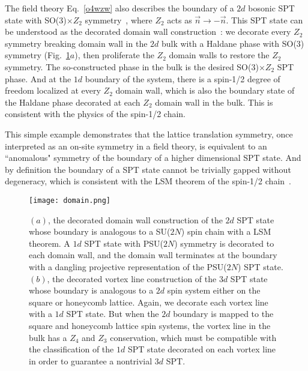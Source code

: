 \documentclass[aps,prb,twocolumn,superscriptaddress,showpacs]{revtex4}
\begin{document}

The field theory Eq.~\ref{o4wzw} also describes the boundary of a
$2d$ bosonic SPT state with SO(3)$\times Z_2$
symmetry~\cite{xu2dspt,xusenthil}, where $Z_2$ acts as $\vec{n}
\rightarrow - \vec{n}$. This SPT state can be understood as the
decorated domain wall construction~\cite{chenluashvin}: we
decorate every $Z_2$ symmetry breaking domain wall in the $2d$
bulk with a Haldane phase with SO(3) symmetry
(Fig.~\ref{domain}$a$), then proliferate the $Z_2$ domain walls to
restore the $Z_2$ symmetry. The so-constructed phase in the bulk
is the desired SO(3)$\times Z_2$ SPT phase. And at the $1d$
boundary of the system, there is a spin-1/2 degree of freedom
localized at every $Z_2$ domain wall, which is also the boundary
state of the Haldane phase decorated at each $Z_2$ domain wall in
the bulk. This is consistent with the physics of the spin-1/2
chain.

This simple example demonstrates that the lattice translation
symmetry, once interpreted as an on-site symmetry in a field
theory, is equivalent to an ``anomalous" symmetry of the boundary
of a higher dimensional SPT state. And by definition the boundary
of a SPT state cannot be trivially gapped without degeneracy,
which is consistent with the LSM theorem of the spin-1/2
chain~\cite{LSM}.

\begin{figure}[tbp]
\begin{center}
\texttt{[image: domain.png]}
\caption{$(a)$, the decorated domain wall construction of the $2d$
SPT state whose boundary is analogous to a SU($2N$) spin chain
with a LSM theorem. A $1d$ SPT state with PSU($2N$) symmetry is
decorated to each domain wall, and the domain wall terminates at
the boundary with a dangling projective representation of the
PSU($2N$) SPT state. $(b)$, the decorated vortex line construction
of the $3d$ SPT state whose boundary is analogous to a $2d$ spin
system either on the square or honeycomb lattice. Again, we
decorate each vortex line with a $1d$ SPT state. But when the $2d$
boundary is mapped to the square and honeycomb lattice spin
systems, the vortex line in the bulk has a $Z_4$ and $Z_3$
conservation, which must be compatible with the classification of
the $1d$ SPT state decorated on each vortex line in order to
guarantee a nontrivial $3d$ SPT. } \label{domain}
\end{center}
\end{figure}
\end{document}
